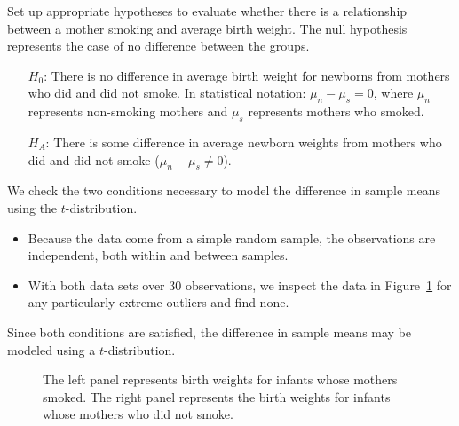 \begin{examplewrap}
\begin{nexample}{Set up appropriate hypotheses to evaluate
    whether there is a relationship between a mother smoking
    and average birth weight.}
  \label{babySmokeHTForWeight}%
  The null hypothesis represents the case of no difference
  between the groups.
  \begin{itemize}
  \setlength{\itemsep}{0mm}
  \item[$H_0$:]
      There is no difference in average birth weight for
      newborns from mothers who did and did not smoke.
      In statistical notation: $\mu_{n} - \mu_{s} = 0$,
      where $\mu_{n}$ represents non-smoking mothers and
      $\mu_s$ represents mothers who smoked.
  \item[$H_A$:]
      There is some difference in average newborn weights
      from mothers who did and did not smoke
      ($\mu_{n} - \mu_{s} \neq 0$).
  \end{itemize}
\end{nexample}
\end{examplewrap}

We check the two conditions necessary to model the difference
in sample means using the $t$-distribution.
\begin{itemize}
\item
    Because the data come from a simple random sample,
    the observations are independent,
    both within and between samples.
\item
    With both data sets over 30 observations,
    we inspect the data in
    Figure~\ref{babySmokePlotOfTwoGroupsToExamineSkew}
    for any particularly extreme outliers
    and find none.
\end{itemize}
Since both conditions are satisfied, the difference
in sample means may be modeled using a $t$-distribution.

\begin{figure}[hhh]
  \centering
  \caption{The left panel represents birth weights for infants
      whose mothers smoked.
      The right panel represents the birth weights for
      infants whose mothers who did not smoke.}
  \label{babySmokePlotOfTwoGroupsToExamineSkew}
\end{figure}



